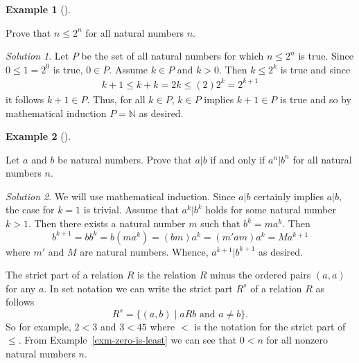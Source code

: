 \documentclass[
  twoside,
  12pt,
  letterpaper]{article}
\theoremstyle{definition}
\theoremstyle{definition}
\theoremstyle{plain}
\theoremstyle{definition}
\newtheorem{example}{Example}[section]
\theoremstyle{plain}
\theoremstyle{remark}
\newtheorem*{solution}{Solution}
\begin{document}
\begin{example}[]\protect\hypertarget{exm-ordering-one}{}\label{exm-ordering-one}

Prove that \(n\leq 2^n\) for all natural numbers \(n.\)

\end{example}

\begin{solution}

Let \(P\) be the set of all natural numbers for which \(n\leq 2^n\) is
true. Since \(0\leq 1=2^0\) is true, \(0\in P.\) Assume \(k\in P\) and
\(k>0\). Then \(k\leq 2^k\) is true and since \begin{align}
k+1 \leq k+k = 2k \leq (2) 2^k = 2^{k+1}
\end{align} it follows \(k+1\in P.\) Thus, for all \(k\in P\),
\(k\in P\) implies \(k+1\in P\) is true and so by mathematical induction
\(P=\mathbb{N}\) as desired.

\end{solution}

\begin{example}[]\protect\hypertarget{exm-div-powers}{}\label{exm-div-powers}

Let \(a\) and \(b\) be natural numbers. Prove that \(a|b\) if and only
if \(a^n|b^n\) for all natural numbers \(n.\)

\end{example}

\begin{solution}

We will use mathematical induction. Since \(a|b\) certainly implies
\(a|b,\) the case for \(k=1\) is trivial. Assume that \(a^k|b^k\) holds
for some natural number \(k>1\). Then there exists a natural number
\(m\) such that \(b^k=m a^k.\) Then \begin{equation}
b^{k+1}=b b^k
=b \left(m a^k\right)
=(b m )a^k
=(m' a m )a^k
=M a^{k+1}
\end{equation} where \(m'\) and \(M\) are natural numbers. Whence,
\(a^{k+1}|b^{k+1}\) as desired.

\end{solution}

The strict part of a relation \(R\) is the relation \(R\) minus the
ordered pairs \((a,a)\) for any \(a.\) In set notation we can write the
strict part \(R^s\) of a relation \(R\) as follows \[
R^s = \{(a,b) \mid aRb \text{ and } a\neq b \}.
\] So for example, \(2<3\) and \(3<45\) where \(<\) is the notation for
the strict part of \(\leq.\) From Example~\ref{exm-zero-is-least} we can
see that \(0<n\) for all nonzero natural numbers \(n\).
\end{document}
